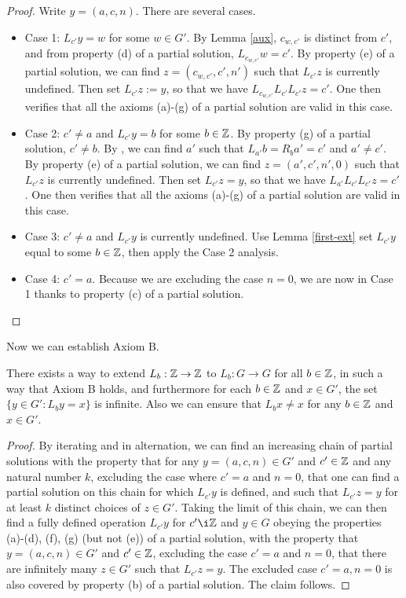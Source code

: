 \begin{proof} Write $y = (a,c,n)$. There are several cases.
  \begin{itemize}
    \item Case 1: $L_{c'} y = w$ for some $w \in G'$.  By Lemma \ref{aux}, $c_{w,c'}$ is distinct from $c'$, and from property (d) of a partial solution, $L_{c_{w,c'}} w = c'$.  By property (e) of a partial solution, we can find $z = (c_{w,c'}, c', n')$ such that $L_{c'} z$ is currently undefined.  Then set $L_{c'} z := y$, so that we have $L_{c_{w,c'}} L_{c'} L_{c'} z = c'$.  One then verifies that all the axioms (a)-(g) of a partial solution are valid in this case.
    \item Case 2: $c' \neq a$ and $L_{c'} y = b$ for some $b \in \mathbb{Z}$. By property (g) of a partial solution, $c' \neq b$.  By , we can find $a'$ such that $L_{a'} b = R_b a' = c'$ and $a' \neq c'$.  By property (e) of a partial solution, we can find $z = (a', c', n', 0)$ such that $L_{c'} z$ is currently undefined.  Then set $L_{c'} z = y$, so that we have $L_{a'} L_{c'} L_{c'} z = c'$. One then verifies that all the axioms (a)-(g) of a partial solution are valid in this case.
    \item Case 3: $c' \neq a$ and $L_{c'} y$ is currently undefined.  Use Lemma \ref{first-ext} set $L_{c'} y$ equal to some $b \in \mathbb{Z}$, then apply the Case 2 analysis.
    \item Case 4: $c' = a$.  Because we are excluding the case $n=0$, we are now in Case 1 thanks to property (c) of a partial solution.
  \end{itemize}
\end{proof}


Now we can establish Axiom B.

\begin{proposition}\label{axiom-b}  There exists a way to extend $L_b: \mathbb{Z} \to \mathbb{Z}$ to $L_b: G \to G$ for all $b \in \mathbb{Z}$, in such a way that Axiom B holds, and furthermore for each $b \in \mathbb{Z}$ and $x \in G'$, the set $\{ y \in G': L_b y = x \}$ is infinite. Also we can ensure that $L_b x \neq x$ for any $b \in \mathbb{Z}$ and $x \in G'$.
\end{proposition}

\begin{proof}
By iterating  and  in alternation, we can find an increasing chain of partial solutions with the property that for any $y = (a,c,n) \in G'$ and $c' \in \mathbb{Z}$ and any natural number $k$, excluding the case where $c'=a$ and $n=0$, that one can find a partial solution on this chain for which $L_{c'} y$ is defined, and such that $L_{c'} z = y$ for at least $k$ distinct choices of $z \in G'$.  Taking the limit of this chain, we can then find a fully defined operation $L_{c'} y$ for $c' \i \Z$ and $y \in G$ obeying the properties (a)-(d), (f), (g) (but not (e)) of a partial solution, with the property that
$y = (a,c,n) \in G'$ and $c' \in \mathbb{Z}$, excluding the case $c'=a$ and $n=0$, that there are infinitely many $z \in G'$ such that $L_{c'} z = y$.  The excluded case $c'=a, n=0$ is also covered by property (b) of a partial solution.  The claim follows.
\end{proof}

